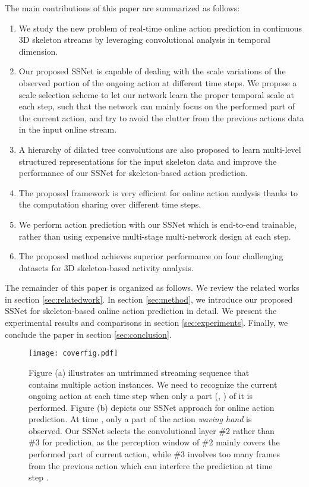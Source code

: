 \documentclass[10pt,twocolumn,letterpaper]{article}
\begin{document}
The main contributions of this paper are summarized as follows:

\begin{enumerate}
  \item
We study the new problem of real-time online action prediction in continuous 3D skeleton streams by leveraging convolutional analysis in temporal dimension.
  \item
Our proposed SSNet is capable of dealing with the scale variations of the observed portion of the ongoing action at different time steps.
We propose a scale selection scheme to let our network learn the proper temporal scale at each step,
such that the network can mainly focus on the performed part of the current action, and try to avoid the clutter from the previous actions data in the input online stream.
\item
A hierarchy of dilated tree convolutions are also proposed
to learn multi-level structured representations for the input skeleton data and improve the performance of our SSNet for skeleton-based action prediction.
  \item
The proposed framework is very efficient for online action analysis thanks to the computation sharing over different time steps.
  \item
We perform action prediction with our SSNet which is end-to-end trainable, rather than using expensive multi-stage multi-network design at each step.
  \item
The proposed method achieves superior performance on four challenging datasets for 3D skeleton-based activity analysis.
\end{enumerate}


The remainder of this paper is organized as follows.
We review the related works in section \ref{sec:relatedwork}.
In section \ref{sec:method}, we introduce our proposed SSNet for skeleton-based online action prediction in detail.
We present the experimental results and comparisons in section \ref{sec:experiments}.
Finally, we conclude the paper in section \ref{sec:conclusion}.

\begin{figure}[t]
	\centerline{\texttt{[image: coverfig.pdf]}}
	\caption{ Figure (a) illustrates an untrimmed streaming sequence that contains multiple action instances.
            We need to recognize the current ongoing action at each time step when only a part (\eg, ) of it is performed.
            Figure (b) depicts our SSNet approach for online action prediction.
At time , only a part of the action \emph{waving hand} is observed.
            Our SSNet selects the convolutional layer \#2 rather than \#3 for prediction,
            as the perception window of \#2 mainly covers the performed part of current action,
            while \#3 involves too many frames from the previous action which can interfere the prediction at time step .}
	\label{fig:coverfig}
\end{figure}
\end{document}
